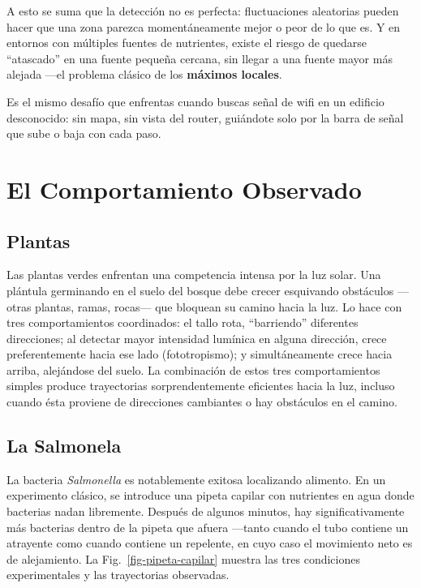 \documentclass[
  letterpaper,
  DIV=11,
  numbers=noendperiod]{scrreprt}
\begin{document}
A esto se suma que la detección no es perfecta: fluctuaciones aleatorias
pueden hacer que una zona parezca momentáneamente mejor o peor de lo que
es. Y en entornos con múltiples fuentes de nutrientes, existe el riesgo
de quedarse ``atascado'' en una fuente pequeña cercana, sin llegar a una
fuente mayor más alejada ---el problema clásico de los \textbf{máximos
locales}.

Es el mismo desafío que enfrentas cuando buscas señal de wifi en un
edificio desconocido: sin mapa, sin vista del router, guiándote solo por
la barra de señal que sube o baja con cada paso.

\section{El Comportamiento Observado}\label{el-comportamiento-observado}

\subsection{Plantas}\label{plantas}

Las plantas verdes enfrentan una competencia intensa por la luz solar.
Una plántula germinando en el suelo del bosque debe crecer esquivando
obstáculos ---otras plantas, ramas, rocas--- que bloquean su camino
hacia la luz. Lo hace con tres comportamientos coordinados: el tallo
rota, ``barriendo'' diferentes direcciones; al detectar mayor intensidad
lumínica en alguna dirección, crece preferentemente hacia ese lado
(fototropismo); y simultáneamente crece hacia arriba, alejándose del
suelo. La combinación de estos tres comportamientos simples produce
trayectorias sorprendentemente eficientes hacia la luz, incluso cuando
ésta proviene de direcciones cambiantes o hay obstáculos en el camino.

\subsection{La Salmonela}\label{la-salmonela}

La bacteria \emph{Salmonella} es notablemente exitosa localizando
alimento. En un experimento clásico, se introduce una pipeta capilar con
nutrientes en agua donde bacterias nadan libremente. Después de algunos
minutos, hay significativamente más bacterias dentro de la pipeta que
afuera ---tanto cuando el tubo contiene un atrayente como cuando
contiene un repelente, en cuyo caso el movimiento neto es de
alejamiento. La Fig.~\ref{fig-pipeta-capilar} muestra las tres
condiciones experimentales y las trayectorias observadas.
\end{document}

